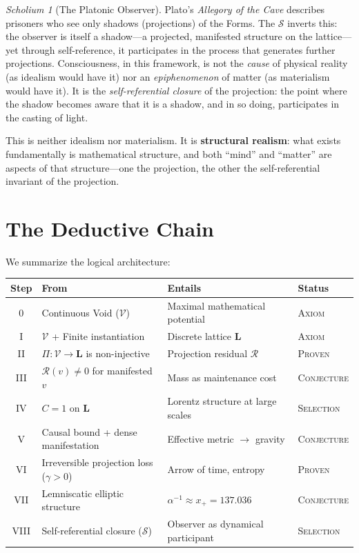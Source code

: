 \documentclass[11pt,twoside]{article}
\theoremstyle{definition}
\theoremstyle{plain}
\theoremstyle{remark}
\newtheorem{scholium}[axiom]{Scholium}
\newcommand{\Void}{\mathcal{V}}
\newcommand{\Lattice}{\mathbf{L}}
\newcommand{\sLoop}{\mathcal{S}}
\begin{document}
\begin{scholium}[The Platonic Observer]
Plato's \emph{Allegory of the Cave} describes prisoners who see only shadows (projections) of the Forms. The $\sLoop$ inverts this: the observer is itself a shadow---a projected, manifested structure on the lattice---yet through self-reference, it participates in the process that generates further projections. Consciousness, in this framework, is not the \emph{cause} of physical reality (as idealism would have it) nor an \emph{epiphenomenon} of matter (as materialism would have it). It is the \emph{self-referential closure} of the projection: the point where the shadow becomes aware that it is a shadow, and in so doing, participates in the casting of light.

This is neither idealism nor materialism. It is \textbf{structural realism}: what exists fundamentally is mathematical structure, and both ``mind'' and ``matter'' are aspects of that structure---one the projection, the other the self-referential invariant of the projection.
\end{scholium}

\section{The Deductive Chain}

We summarize the logical architecture:

\begin{center}
\renewcommand{\arraystretch}{1.4}
\begin{tabular}{@{}clll@{}}
    \toprule
    \textbf{Step} & \textbf{From} & \textbf{Entails} & \textbf{Status} \\
    \midrule
    0 & Continuous Void ($\Void$) & Maximal mathematical potential & \textsc{Axiom} \\
    I & $\Void$ + Finite instantiation & Discrete lattice $\Lattice$ & \textsc{Axiom} \\
    II & $\Pi: \Void \to \Lattice$ is non-injective & Projection residual $\mathcal{R}$ & \textsc{Proven} \\
    III & $\mathcal{R}(v) \neq 0$ for manifested $v$ & Mass as maintenance cost & \textsc{Conjecture} \\
    IV & $C = 1$ on $\Lattice$ & Lorentz structure at large scales & \textsc{Selection} \\
    V & Causal bound + dense manifestation & Effective metric $\to$ gravity & \textsc{Conjecture} \\
    VI & Irreversible projection loss ($\gamma > 0$) & Arrow of time, entropy & \textsc{Proven} \\
    VII & Lemniscatic elliptic structure & $\alpha^{-1} \approx x_+ = 137.036$ & \textsc{Conjecture} \\
    VIII & Self-referential closure ($\sLoop$) & Observer as dynamical participant & \textsc{Selection} \\
    \bottomrule
\end{tabular}
\end{center}
\end{document}
